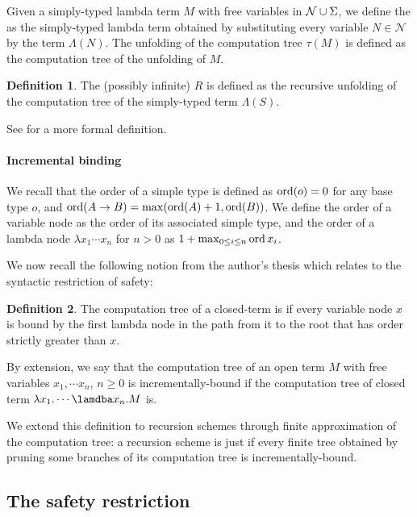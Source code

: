 \documentclass[a4paper,draft]{article}[12pt]
\theoremstyle{remark}
\theoremstyle{definition}
\newtheorem{definition}{Definition}[section]
\begin{document}
Given a simply-typed lambda term $M$ with free variables in $\mathcal{N} \cup \Sigma$, we define the  as the simply-typed lambda term obtained by substituting every variable $N \in \mathcal{N}$ by the term $\Lambda (N)$. The unfolding of the computation tree $\tau(M)$ is defined as the computation tree of the unfolding of $M$.

\begin{definition}
The (possibly infinite)  $R$ is defined as the recursive unfolding 
of the computation tree of the simply-typed term $\Lambda(S)$. 
\end{definition}
See \cite{OngLics2006} for a more formal definition.

\paragraph{Incremental binding}
We recall that the order of a simple type is defined as $\mathop{\mathrm{ord}}(o) = 0$ for any base type $o$, and $\mathop{\mathrm{ord}}(A \rightarrow B) = \max(\mathop{\mathrm{ord}}(A)+1, \mathop{\mathrm{ord}}(B))$. We define the order of a variable node as the order of its associated simple type, and the order of a lambda node $\lambda x_1 \cdots x_n$ for $n>0$ as $1 + \max_{0\leq i\leq n} \mathop{\mathrm{ord}}{x_i}$.

We now recall the following notion from the author's thesis \cite{BlumPhd,blumong:safelambdacalculus} which relates to the syntactic restriction of safety:
\begin{definition}
The computation tree of a closed-term is  if every variable node $x$ is bound by the first lambda node in the path from it to the root that has order strictly greater than $x$.

By extension, we say that the computation tree of an open term $M$ with free variables $x_1, \cdots x_n$, $n\geq 0$ is incrementally-bound if the computation tree of closed term $\lambda x_1 . \cdots \lamdba x_n . M$ is.
\end{definition} 

We extend this definition to recursion schemes through finite approximation of the computation tree: a recursion scheme is  just if every finite tree obtained by pruning some branches of its computation tree is incrementally-bound.


\subsection{The safety restriction}
\label{sec:safety}
\end{document}
